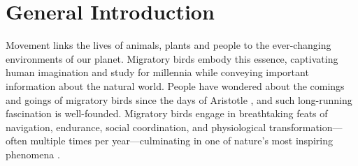 \documentclass[a4paper, nobind]{templates/ociamthesis}
\begin{document}
\begin{romanpages}

\flushbottom

\setlength{\baselineskip}{16pt plus1pt minus1pt} %
\tableofcontents
\setlength{\baselineskip}{\frontmatterbaselineskip} %



\end{romanpages}

\flushbottom

\hypertarget{general-introduction}{%
\chapter*{General Introduction}\label{general-introduction}}


\adjustmtc

Movement links the lives of animals, plants and people to the ever-changing environments of our planet. Migratory birds embody this essence, captivating human imagination and study for millennia while conveying important information about the natural world. People have wondered about the comings and goings of migratory birds since the days of Aristotle \autocite{waltersConciseHistoryOrnithology2003}, and such long-running fascination is well-founded. Migratory birds engage in breathtaking feats of navigation, endurance, social coordination, and physiological transformation---often multiple times per year---culminating in one of nature's most inspiring phenomena \autocite{alerstamBirdMigration1990,newtonMigrationEcologyBirds2008}.
\end{document}
